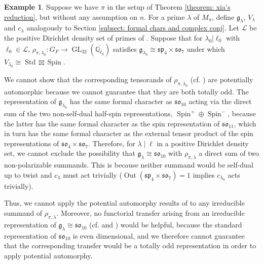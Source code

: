 \documentclass{amsart}
\theoremstyle{definition}
\newtheorem{example}[theorem]{Example}
\numberwithin{equation}{section} %
\newcommand{\GL}{\operatorname{GL}}
\newcommand{\splie}{\mathfrak{sp}}
\newcommand{\solie}{\mathfrak{so}}
\newcommand{\Out}{\operatorname{Out}}
\newcommand{\Std}{\operatorname{Std}}
\newcommand{\Spin}{\operatorname{Spin}}
\newcommand{\Qlzerobar}{\ensuremath{\overline{\mathbb{Q}_{\ell_0}}}}
\newcommand{\mc}[1]{\mathcal{#1}}
\newcommand{\mf}[1]{\mathfrak{#1}}
\begin{document}
\begin{example} \label{example: n=32 fails}
Suppose we have \( \pi \) in the setup of Theorem \ref{theorem: xia's reduction}, but without any assumption on $n$.
For a prime $\lambda$ of $M_\pi$, define $\mf{g}_\lambda$, $V_\lambda$ and $c_\lambda$ analogously to Section \ref{subsect: formal chars and complex conj}.
Let $\mc{L}$ be the positive Dirichlet density set of primes of . Suppose that for $\lambda_0|\ell_0$ with $\ell_0 \in \mathcal{L}$, $\rho_{\pi,\lambda_0}: G_F \to \GL_{32}(\Qlzerobar)$ satisfies $\mf{g}_{\lambda_0} \cong \splie_4 \times \solie_7$ under which $V_{\lambda_0} \cong \Std \boxtimes \Spin$.

We cannot show that the corresponding tensorands of $\rho_{\pi,\lambda_0}$ (cf. ) are potentially automorphic because we cannot guarantee that they are both totally odd.
The representation of $\mf{g}_{\lambda_0}$ has the same formal character as $\solie_{10}$ acting via the direct sum of the two non-self-dual half-spin representations, $\Spin^+ \oplus \Spin^-$, because the latter has the same formal character as the spin representation of $\solie_{11}$, which in turn has the same formal character as the external tensor product of the spin representations of $\solie_4 \times \solie_7$.
Therefore, for \( \lambda\mid \ell \) in a positive Dirichlet density set, we cannot exclude the possibility that $\mf{g}_\lambda \cong \solie_{10}$ with $\rho_{\pi,\lambda}$ a direct sum of two non-polarizable summands. 
This is because neither summand would be self-dual up to twist and $c_\lambda$ must act trivially ($\Out(\splie_4 \times \solie_7)=1$ implies $c_{\lambda_0}$ acts trivially).

Thus, we cannot apply the potential automorphy results of \cite{BLGGT14} to any irreducible summand of $\rho_{\pi,\lambda}$.
Moreover, no functorial transfer arising from an irreducible representation of $\mf{g}_\lambda \cong \solie_{10}$ (cf.  and ) would be helpful, because the standard representation of $\solie_{10}$ is even dimensional, and we therefore cannot guarantee that the corresponding transfer would be a totally odd representation in order to apply potential automorphy.
\end{example}



\end{document}

